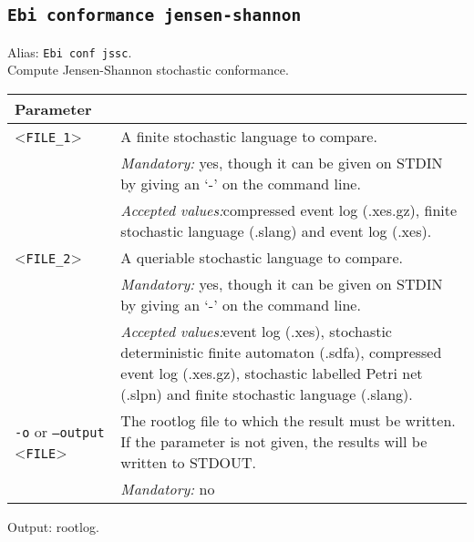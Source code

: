 {\subsection{\texttt{Ebi conformance jensen-shannon}}
\label{command:Ebi conformance jensen-shannon}
Alias: \texttt{Ebi conf jssc}.\\
Compute Jensen-Shannon stochastic conformance.\\
\begin{tabularx}{\linewidth}{lX}
\toprule
Parameter \\\midrule
<\texttt{FILE\_1}>&A finite stochastic language to compare.\\
&\textit{Mandatory:} \quad yes, though it can be given on STDIN by giving an `-' on the command line.\\
&\textit{Accepted values:}\quad compressed event log (.xes.gz), finite stochastic language (.slang) and event log (.xes).\\
<\texttt{FILE\_2}>&A queriable stochastic language to compare.\\
&\textit{Mandatory:} \quad yes, though it can be given on STDIN by giving an `-' on the command line.\\
&\textit{Accepted values:}\quad event log (.xes), stochastic deterministic finite automaton (.sdfa), compressed event log (.xes.gz), stochastic labelled Petri net (.slpn) and finite stochastic language (.slang).\\
\texttt{-o} or \texttt{--output} <\texttt{FILE}> &
The rootlog file to which the result must be written. If the parameter is not given, the results will be written to STDOUT.\\
&\textit{Mandatory:} \quad no\\
\bottomrule
\end{tabularx}
Output: rootlog.
}
